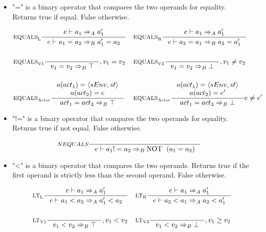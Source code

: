 \begin{itemize}
\item "=" is a binary operator that compares the two operands for equality. Returns true if equal. False otherwise.

\begin{align*}
&\inference[$\text{EQUALS}_\text{L}$]{e \vdash a_1 \Rightarrow_A a_1'}
                    {e \vdash a_1 = a_2 \Rightarrow_B a_1' = a_2}
&
&\inference[$\text{EQUALS}_\text{R}$]{e \vdash a_1 \Rightarrow_A a_1'}
                    {e \vdash a_2 = a_1 \Rightarrow_B a_2 = a_1'}
\\\\
&\inference[$\text{EQUALS}_\text{V1}$]{}
                    {v_1 = v_2 \Rightarrow_B \top}
                    {, v_1 = v_2}
&
&\inference[$\text{EQUALS}_\text{V2}$]{}
                    {v_1 = v_2 \Rightarrow_B \bot}
                    {, v_1 \neq v_2}
\\\\
&\inference[$\text{EQUALS}_\text{Actor}$]{a(act_1) = \Braket{sEnv, st}\\ a(act_2) = e}
                    {act_1 = act_2 \Rightarrow_B \top}
&
&\inference[$\text{EQUALS}_\text{Actor}$]{a(act_1) = \Braket{sEnv, st}\\ a(act_2) = e'}
                    {act_1 = act_2 \Rightarrow_B \bot}
                    {e \neq e'}
\end{align*}

\item "!=" is a binary operator that compares the two operands for equality. Returns true if not equal. False otherwise.

\begin{align*}
&\inference[$NEQUALS$]{}
                    {e \vdash a_1 != a_2 \Rightarrow_B \Tnot (a_1 = a_2)}
\end{align*}

\item "<" is a binary operator that compares the two operands. Returns true if the first operand is strictly less than the second operand. False otherwise.

\begin{align*}
&\inference[$\text{LT}_\text{L}$]{e \vdash a_1 \Rightarrow_A a_1'}
                    {e \vdash a_1 < a_2 \Rightarrow_A a_1' < a_2}
&
&\inference[$\text{LT}_\text{R}$]{e \vdash a_1 \Rightarrow_A a_1'}
                    {e \vdash a_2 < a_1 \Rightarrow_A a_2 < a_1'}
\\\\
&\inference[$\text{LT}_\text{V1}$]{}
                    {v_1 < v_2 \Rightarrow_B \top}
                    {, v_1 < v_2}
&
&\inference[$\text{LT}_\text{V2}$]{}
                    {v_1 < v_2 \Rightarrow_B \bot}
                    {, v_1 \geq v_2}
\end{align*}


\end{itemize}
